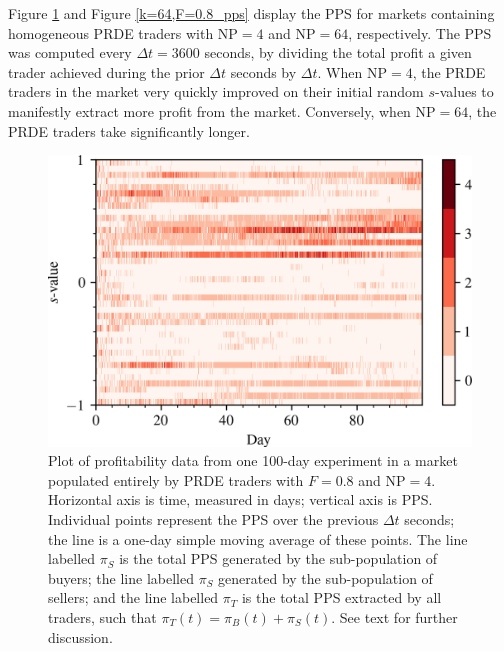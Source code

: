 \documentclass[conference]{IEEEtran}
\begin{document}
Figure \ref{k=4,F=0.8_pps} and Figure \ref{k=64,F=0.8_pps} display the PPS for markets containing homogeneous PRDE traders with $\mathrm{NP=4}$ and $\mathrm{NP}=64$, respectively.
The PPS was computed every $\Delta t=3600$ seconds, by dividing the total profit a given trader achieved during the prior $\Delta t$ seconds by $\Delta t$.
When $\mathrm{NP}=4$, the PRDE traders in the market very quickly improved on their initial random $s$-values to manifestly extract more profit from the market.
Conversely, when $\mathrm{NP}=64$, the PRDE traders take significantly longer.

\begin{figure}[htbp]
    \centerline{\includegraphics[width=\columnwidth]{k=14,F=0.0_buy_strats.png}}
    \caption{
        Plot of profitability data from one 100-day experiment in a market populated entirely by PRDE traders with $F=0.8$ and $\mathrm{NP}=4$.
        Horizontal axis is time, measured in days; vertical axis is PPS. 
        Individual points represent the PPS over the previous $\Delta t$ seconds; the line is a one-day simple moving average of these points.
        The line labelled $\pi_S$ is the total PPS generated by the sub-population of buyers; the line labelled $\pi_S$ generated by the sub-population of sellers; and the line labelled $\pi_T$ is the total PPS extracted by all traders, such that $\pi_T(t)=\pi_B(t)+\pi_S(t)$.
        See text for further discussion.
    }
    \label{k=4,F=0.8_pps}
\end{figure}
\end{document}
